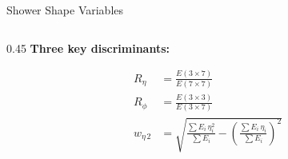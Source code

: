 \documentclass[aspectratio=169,10pt]{beamer}
\begin{document}
\begin{frame}{Shower Shape Variables}
\begin{columns}[T]
\begin{column}{0.45\textwidth}
  \textbf{Three key discriminants:}
  \vspace{4pt}

  \begin{align*}
    R_\eta &= \frac{E(3\!\times\!7)}{E(7\!\times\!7)}
    \\[6pt]
    R_\phi &= \frac{E(3\!\times\!3)}{E(3\!\times\!7)}
    \\[6pt]
    w_{\eta\,2} &= \sqrt{
      \frac{\sum E_i\,\eta_i^2}{\sum E_i}
      - \left(\frac{\sum E_i\,\eta_i}{\sum E_i}\right)^{\!2}
    }
  \end{align*}
  \vspace{4pt}


\end{column}
\end{columns}
\end{frame}
\end{document}
